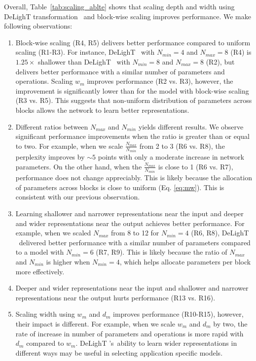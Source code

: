  Overall, Table~\ref{tab:scaling_ablte} shows that scaling depth and width using DeLighT transformation ~and block-wise scaling improves performance. We make following observations: 
\vspace{-1mm}
\begin{enumerate}[leftmargin=*, label=\alph*)]
\setlength\itemsep{0em}
\item Block-wise scaling (R4, R5) delivers better performance compared to uniform scaling (R1-R3). For instance, DeLighT ~with $N_{min}=4$ and $N_{max}=8$ (R4) is $1.25\times$ shallower than DeLighT ~with $N_{min}=8$ and $N_{max}=8$ (R2), but delivers better performance with a similar  number of parameters and operations. Scaling $w_m$ improves performance (R2 vs. R3), however, the improvement is significantly lower than for the model with block-wise scaling (R3 vs. R5). This suggests that non-uniform distribution of parameters across blocks allows the network to learn better representations.  

\item Different ratios between $N_{max}$ and $N_{min}$ yields different results. We observe significant performance improvements when the ratio is greater than or equal to two. For example, when we scale $\frac{N_{max}}{N_{min}}$ from 2 to 3 (R6 vs. R8), the perplexity improves by ${\sim}5$ points with only a moderate increase in network parameters. On the other hand, when the $\frac{N_{max}}{N_{min}}$ is close to 1 (R6 vs. R7), performance does not change appreciably. This is likely because the allocation of parameters across blocks is close to uniform (Eq. \ref{eq:mw}). This is consistent with our previous observation. 

\item Learning shallower and narrower representations near the input and deeper and wider representations near the output achieves better performance. For example, when we scaled $N_{max}$ from 8 to 12 for $N_{min}=4$ (R6, R8), DeLighT ~delivered better performance with a similar number of parameters compared to a model with $N_{min}=6$ (R7, R9). This is likely because the ratio of $N_{max}$ and $N_{min}$ is higher when $N_{min}=4$, which helps allocate parameters per block more effectively. 
\item Deeper and wider representations near the input and shallower and narrower representations near the output hurts performance (R13 vs. R16). 
\item Scaling width using $w_m$ and $d_m$ improves performance (R10-R15), however, their impact is different. For example, when we scale $w_m$ and $d_m$ by two, the rate of increase in number of parameters and operations is more rapid with  $d_m$ compared to $w_m$. DeLighT 's~ability to learn wider representations in different ways may be useful in selecting application specific models.
\end{enumerate}

